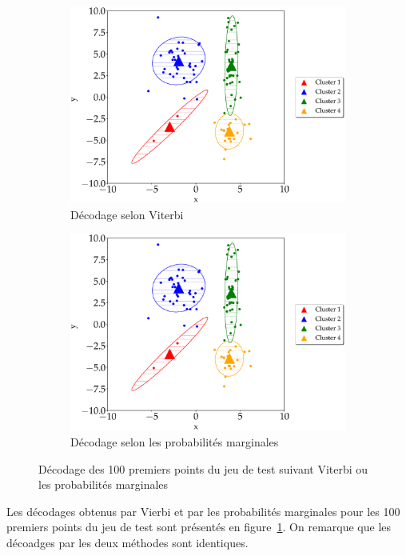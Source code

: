 \documentclass[12pt,a4paper,onecolumn]{article}
\begin{document}
\subsection{}

\begin{figure}[H]
	\centering
	\begin{subfigure}[b]{0.90\textwidth}
		\centering
		\includegraphics[width = 1.0\textwidth]{11_viterbi_decoding_test}
		\caption{Décodage selon Viterbi}
	\end{subfigure}
	\hfill
	\begin{subfigure}[b]{0.90\textwidth}
		\centering
		\includegraphics[width = 1.0\textwidth]{10_marginals}
		\caption{Décodage selon les probabilités marginales}
	\end{subfigure}
	\caption{Décodage des 100 premiers points du jeu de test suivant Viterbi ou les probabilités marginales}
	\label{fig_11_decodage_test}
\end{figure}

Les décodages obtenus par Vierbi et par les probabilités marginales pour les 100 premiers points du jeu de test sont présentés en figure~\ref{fig_11_decodage_test}. On remarque que les décoadges par les deux méthodes sont identiques.
\end{document}
